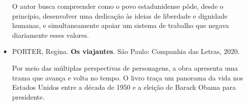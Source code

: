 \documentclass[11pt]{extarticle}
\begin{document}
\begin{itemize}
O autor busca compreender como o povo estadunidense pôde, desde o
princípio, desenvolver uma dedicação às ideias de liberdade e dignidade
humanas, e simultaneamente apoiar um sistema de trabalho que negava
diariamente esses valores.

\item
  PORTER, Regina. \textbf{Os viajantes}. São Paulo: Companhia das
  Letras, 2020.

Por meio das múltiplas perspectivas de personagens, a obra apresenta uma
trama que avança e volta no tempo. O livro traça um panorama da vida nos
Estados Unidos entre a década de 1950 e a eleição de Barack Obama para
presidente.

\end{itemize}
\end{document}
